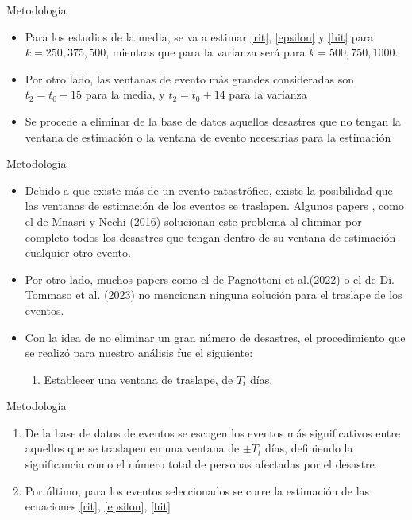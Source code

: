 \documentclass{beamer}
\newcounter{saveenumi}
\newcommand{\seti}{\setcounter{saveenumi}{\value{enumi}}}
\newcommand{\conti}{\setcounter{enumi}{\value{saveenumi}}}
\begin{document}
\begin{frame}{Metodología}
\begin{itemize}
    \item Para los estudios de la media, se va a estimar \eqref{rit}, \eqref{epsilon} y \eqref{hit} para $k = 250, 375, 500$, mientras que para la varianza será para $k=500, 750 , 1000$.
    \item Por otro lado, las ventanas de evento más grandes consideradas son $t_2=t_0+15$ para la media, y $t_2=t_0+14$ para la varianza
    \item Se procede a eliminar de la base de datos aquellos desastres que no tengan la ventana de estimación o la ventana de evento necesarias para la estimación
\end{itemize}
\end{frame}

\begin{frame}{Metodología}
\begin{itemize}
    \item Debido a que existe más de un evento catastrófico, existe la posibilidad que las ventanas de estimación de los eventos se traslapen. Algunos papers , como el de Mnasri y Nechi (2016) solucionan este problema al eliminar por completo todos los desastres que tengan dentro de su ventana de estimación cualquier otro evento.
    \item Por otro lado, muchos papers como el de Pagnottoni et al.(2022) o el de Di. Tommaso et al. (2023) no mencionan ninguna solución para el traslape de los eventos.
    \item Con la idea de no eliminar un gran número de desastres, el procedimiento que se realizó para nuestro análisis fue el siguiente:
    \begin{enumerate}
        \item Establecer una ventana de traslape, de $T_t$ días.
        \seti
    \end{enumerate}
\end{itemize}
\end{frame}

\begin{frame}{Metodología}
\begin{enumerate}
    \conti
    \item De la base de datos de eventos se escogen los eventos más significativos entre aquellos que se traslapen en una ventana de $\pm T_t$ días, definiendo la significancia como el número total de personas afectadas por el desastre.
    \item Por último, para los eventos seleccionados se corre la estimación de las ecuaciones \eqref{rit}, \eqref{epsilon}, \eqref{hit}
    \seti
\end{enumerate}
\end{frame}
\end{document}
